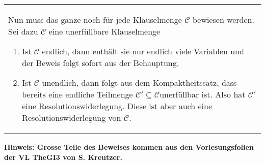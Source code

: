 \documentclass[a4paper,10pt]{article}
\newcommand{\tabspace}{15cm}
\begin{document}
\begin{tabular}{@{} p{\tabspace}}
Nun muss das ganze noch für jede Klauselmenge $\mathcal{C}$ bewiesen werden. Sei dazu $\mathcal{C}$ eine unerfüllbare Klauselmenge
\begin{enumerate}
	\item Ist $\mathcal{C}$ endlich, dann enthält sie nur endlich viele Variablen und der Beweis folgt sofort aus der Behauptung. 
	\item Ist $\mathcal{C}$ unendlich, dann folgt aus dem Kompaktheitssatz, dass bereits eine endliche Teilmenge $\mathcal{C}'\subseteq \mathcal{C} $unerfüllbar ist. Also hat $\mathcal{C}'$ eine Resolutionswiderlegung. Diese ist aber auch eine Resolutionswiderlegung von $\mathcal{C}$.	
\end{enumerate}
\end{tabular}

\begin{center}\textbf{Hinweis: Grosse Teile des Beweises kommen aus den Vorlesungsfolien der VL TheGI3 von S. Kreutzer. }\end{center}
\end{document}
